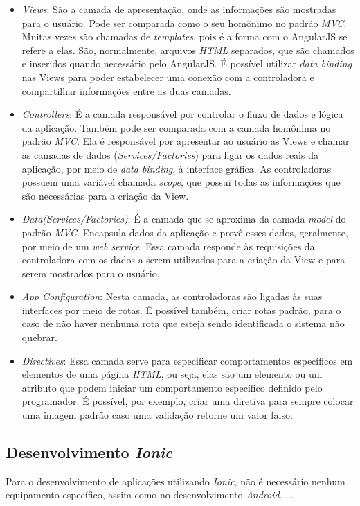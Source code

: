 \begin{itemize}
    \item \textit{Views}: São a camada de apresentação, onde as informações são mostradas para o usuário. Pode ser comparada como 
    o seu homônimo no padrão \textit{MVC}. Muitas vezes são chamadas de \textit{templates}, pois é a forma com o AngularJS 
    se refere a elas. São, normalmente, arquivos \textit{HTML} separados, que são chamados e inseridos quando necessário pelo
    AngularJS. É possível utilizar \textit{data binding} nas Views para poder estabelecer uma conexão com a controladora
    e compartilhar informações entre as duas camadas.
    \item \textit{Controllers}: É a camada responsável por controlar o fluxo de dados e lógica da aplicação. Também pode ser
    comparada com a camada homônima no padrão \textit{MVC}. Ela é responsável por apresentar ao usuário as Views e chamar as camadas
    de dados (\textit{Services/Factories}) para ligar os dados reais da aplicação, por meio de \textit{data binding}, à interface
    gráfica. As controladoras possuem uma variável chamada \textit{scope}, que possui todas as informações que são necessárias 
    para a criação da View.
    \item \textit{Data(Services/Factories)}: É a camada que se aproxima da camada \textit{model} do padrão \textit{MVC}. Encapsula
    dados da aplicação e provê esses dados, geralmente, por meio de um \textit{web service}. Essa camada responde às requisições
    da controladora com os dados a serem utilizados para a criação da View e para serem mostrados para o usuário. 
    \item \textit{App Configuration}: Nesta camada, as controladoras são ligadas às suas interfaces por meio de rotas. É possível
    também, criar rotas padrão, para o caso de não haver nenhuma rota que esteja sendo identificada o sistema não quebrar.
    \item \textit{Directives}: Essa camada serve para especificar comportamentos específicos em elementos de uma página 
    \textit{HTML}, ou seja, elas são um elemento ou um atributo que podem iniciar um comportamento específico definido 
    pelo programador. É possível, por exemplo, criar uma diretiva para sempre colocar uma imagem padrão caso uma validação 
    retorne um valor falso.  
\end{itemize}

\subsection{Desenvolvimento \textit{Ionic}} \label{subsec:dev-ionic}
Para o desenvolvimento de aplicações utilizando \textit{Ionic}, não é necessário nenhum equipamento específico, assim como no desenvolvimento \textit{Android}.
...

